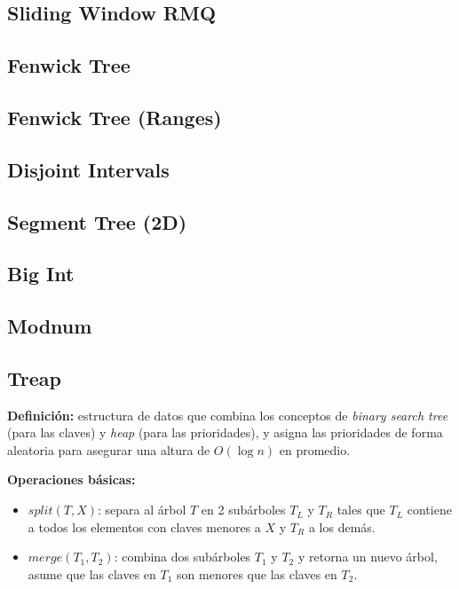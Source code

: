 \subsection{Sliding Window RMQ}
\subsection{Fenwick Tree}
\subsection{Fenwick Tree (Ranges)}

\subsection{Disjoint Intervals}
\subsection{Segment Tree (2D)}
\subsection{Big Int}
\subsection{Modnum}

\subsection{Treap}
\textbf{Definición:} estructura de datos que combina los conceptos de \emph{binary search tree} (para las claves)
y \emph{heap} (para las prioridades), y asigna las prioridades de forma aleatoria para asegurar una altura de 
$O(\log{}n)$ en promedio.

\textbf{Operaciones básicas:}
\begin{itemize}
	\item $split(T, X)$: separa al árbol $T$ en 2 subárboles $T_L$ y $T_R$ tales que $T_L$ contiene a todos los 
	elementos con claves menores a $X$ y $T_R$ a los demás.
	\item $merge(T_1, T_2)$: combina dos subárboles $T_1$ y $T_2$ y retorna un nuevo árbol, 
	asume que las claves en $T_1$ son menores que las claves en $T_2$.
\end{itemize}

